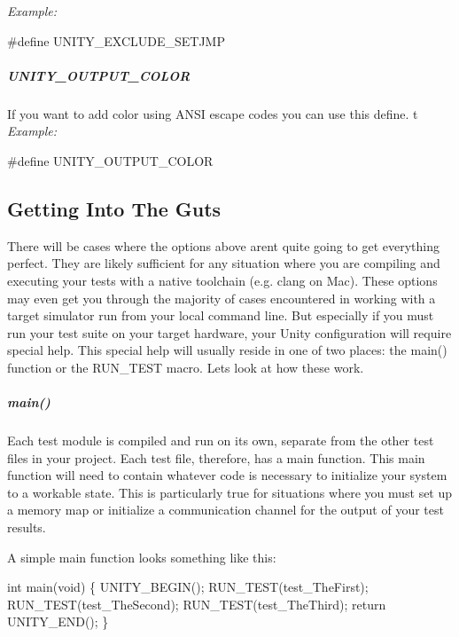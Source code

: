 {\itshape Example\+:} 
\begin{DoxyCode}
\textcolor{preprocessor}{#define UNITY\_EXCLUDE\_SETJMP}
\end{DoxyCode}


\subparagraph*{{\ttfamily U\+N\+I\+T\+Y\+\_\+\+O\+U\+T\+P\+U\+T\+\_\+\+C\+O\+L\+OR}}

If you want to add color using A\+N\+SI escape codes you can use this define. t {\itshape Example\+:} 
\begin{DoxyCode}
\textcolor{preprocessor}{#define UNITY\_OUTPUT\_COLOR}
\end{DoxyCode}


\subsection*{Getting Into The Guts}

There will be cases where the options above aren\textquotesingle{}t quite going to get everything perfect. They are likely sufficient for any situation where you are compiling and executing your tests with a native toolchain (e.\+g. clang on Mac). These options may even get you through the majority of cases encountered in working with a target simulator run from your local command line. But especially if you must run your test suite on your target hardware, your Unity configuration will require special help. This special help will usually reside in one of two places\+: the {\ttfamily main()} function or the {\ttfamily R\+U\+N\+\_\+\+T\+E\+ST} macro. Let\textquotesingle{}s look at how these work.

\subparagraph*{{\ttfamily main()}}

Each test module is compiled and run on its own, separate from the other test files in your project. Each test file, therefore, has a {\ttfamily main} function. This {\ttfamily main} function will need to contain whatever code is necessary to initialize your system to a workable state. This is particularly true for situations where you must set up a memory map or initialize a communication channel for the output of your test results.

A simple main function looks something like this\+:


\begin{DoxyCode}
\textcolor{keywordtype}{int} main(\textcolor{keywordtype}{void}) \{
    UNITY\_BEGIN();
    RUN\_TEST(test\_TheFirst);
    RUN\_TEST(test\_TheSecond);
    RUN\_TEST(test\_TheThird);
    \textcolor{keywordflow}{return} UNITY\_END();
\}
\end{DoxyCode}


